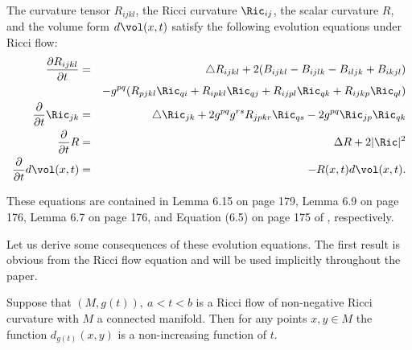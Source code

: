 \begin{theorem}\label{thm:curvature-evolution}
\leanok
\label{thmRmevol}

The curvature tensor $R_{ijkl}$, the Ricci curvature $\Ric_{ij}$, the scalar
curvature $R$, and the volume form $d\vol(x,t)$ satisfy the following evolution
equations under Ricci flow:
\begin{eqnarray}
\frac{\partial R_{ijkl}}{\partial t} &= & \triangle R_{ijkl} +2(B_{ijkl} -
B_{ijlk}-B_{iljk} + B_{ikjl})\nonumber \\&  &  - g^{pq}(R_{pjkl}\Ric_{qi} +
R_{ipkl}\Ric_{qj} + R_{ijpl}\Ric_{qk} +
R_{ijkp}\Ric_{ql}) \label{Rmevol} \\
\label{Ricevol} \frac{\partial}{\partial t}\Ric_{jk} & = & \triangle
\Ric_{jk}+2g^{pq}g^{rs}R_{jpkr}\Ric_{qs}-2g^{pq}\Ric_{jp}\Ric_{qk} \\
\label{Revol}\frac{\partial}{\partial t}R & = & \Delta R+2|\Ric|^2 \\
\label{dvolevol} \frac{\partial}{\partial t}d\vol(x,t) & = &
-R(x,t)d\vol(x,t).
\end{eqnarray}
\end{theorem}

These equations are contained in Lemma 6.15  on page 179, Lemma 6.9
 on page 176,  Lemma 6.7 on page 176, and Equation (6.5) on
page 175 of \cite{ChowKnopf}, respectively.


Let us derive some consequences of these evolution equations.
The first result is obvious from the Ricci flow equation and will be used implicitly throughout
the paper.

\begin{lemma}\label{lem:distance-nonincreasing}
\leanok
\label{posdistdec}

Suppose that $(M,g(t)),\ a<t<b$ is a Ricci flow of non-negative Ricci curvature
with $M$ a connected manifold.
Then for any points $x,y\in M$ the function $d_{g(t)}(x,y)$ is a non-increasing function of $t$.
\end{lemma}


